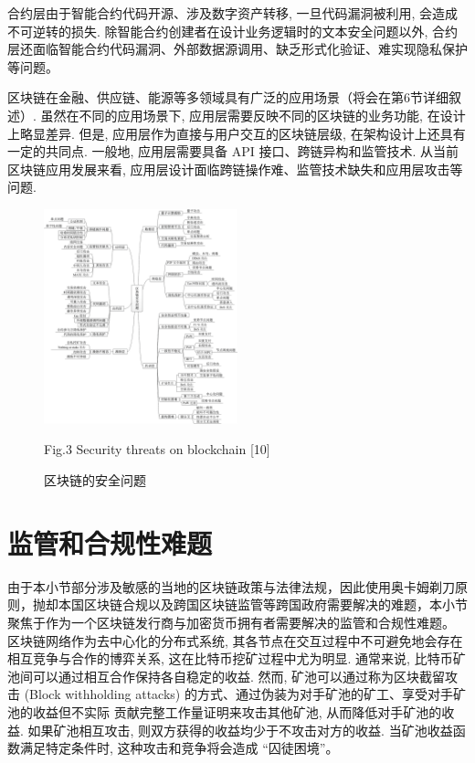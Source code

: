 合约层由于智能合约代码开源、涉及数字资产转移, 一旦代码漏洞被利用, 会造成不可逆转的损失. 除智能合约创建者在设计业务逻辑时的文本安全问题以外, 合约层还面临智能合约代码漏洞、外部数据源调用、缺乏形式化验证、难实现隐私保护等问题。

区块链在金融、供应链、能源等多领域具有广泛的应用场景（将会在第6节详细叙述）. 虽然在不同的应用场景下, 应用层需要反映不同的区块链的业务功能, 在设计上略显差异. 但是, 应用层作为直接与用户交互的区块链层级, 在架构设计上还具有一定的共同点. 一般地, 应用层需要具备 API 接口、跨链异构和监管技术. 从当前区块链应用发展来看, 应用层设计面临跨链操作难、监管技术缺失和应用层攻击等问题.

\begin{figure}
	\centering
	\includegraphics[width=0.5\textwidth]{img/3.png}
	\caption{区块链的安全问题}
	 Fig.3	Security threats on blockchain [10]
	\label{fig:example}
\end{figure}

\section{监管和合规性难题}

由于本小节部分涉及敏感的当地的区块链政策与法律法规，因此使用奥卡姆剃刀原则，抛却本国区块链合规以及跨国区块链监管等跨国政府需要解决的难题，本小节聚焦于作为一个区块链发行商与加密货币拥有者需要解决的监管和合规性难题。 \\

区块链网络作为去中心化的分布式系统, 其各节点在交互过程中不可避免地会存在相互竞争与合作的博弈关系, 这在比特币挖矿过程中尤为明显. 通常来说, 比特币矿池间可以通过相互合作保持各自稳定的收益. 然而, 矿池可以通过称为区块截留攻击 (Block withholding attacks) 的方式、通过伪装为对手矿池的矿工、享受对手矿池的收益但不实际 贡献完整工作量证明来攻击其他矿池, 从而降低对手矿池的收益. 如果矿池相互攻击, 则双方获得的收益均少于不攻击对方的收益. 当矿池收益函数满足特定条件时, 这种攻击和竞争将会造成 “囚徒困境”。 

